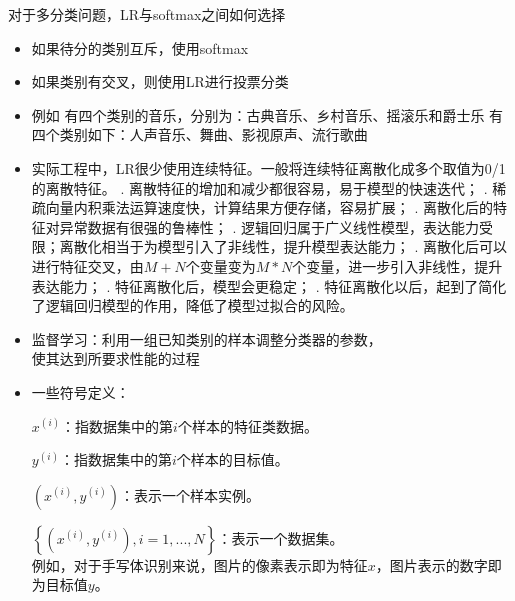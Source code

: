 \documentclass[10pt,a4paper]{ctexbook}
\begin{document}
对于多分类问题，LR与softmax之间如何选择
\begin{itemize}
\item 如果待分的类别互斥，使用softmax
\item 如果类别有交叉，则使用LR进行投票分类
\item 例如
    \subitem 有四个类别的音乐，分别为：古典音乐、乡村音乐、摇滚乐和爵士乐
    \subitem 有四个类别如下：人声音乐、舞曲、影视原声、流行歌曲
\end{itemize}

\begin{itemize}
\item 实际工程中，LR很少使用连续特征。一般将连续特征离散化成多个取值为0/1的离散特征。
. 离散特征的增加和减少都很容易，易于模型的快速迭代；
. 稀疏向量内积乘法运算速度快，计算结果方便存储，容易扩展；
. 离散化后的特征对异常数据有很强的鲁棒性；
. 逻辑回归属于广义线性模型，表达能力受限；离散化相当于为模型引入了非线性，提升模型表达能力；
. 离散化后可以进行特征交叉，由$M+N$个变量变为$M*N$个变量，进一步引入非线性，提升表达能力；
. 特征离散化后，模型会更稳定；
. 特征离散化以后，起到了简化了逻辑回归模型的作用，降低了模型过拟合的风险。

\end{itemize}




\begin{itemize}
\item 监督学习：利用一组已知类别的样本调整分类器的参数，\\使其达到所要求性能的过程
\item 一些符号定义：

$x^{(i)}$：指数据集中的第$i$个样本的特征类数据。

$y^{(i)}$：指数据集中的第$i$个样本的目标值。

$\left(x^{(i)},y^{(i)}\right)$：表示一个样本实例。

$\left\{\left(x^{(i)},y^{(i)}\right), i=1,...,N\right\}$：表示一个数据集。
\\例如，对于手写体识别来说，图片的像素表示即为特征$x$，图片表示的数字即为目标值$y$。

\end{itemize}
\end{document}
